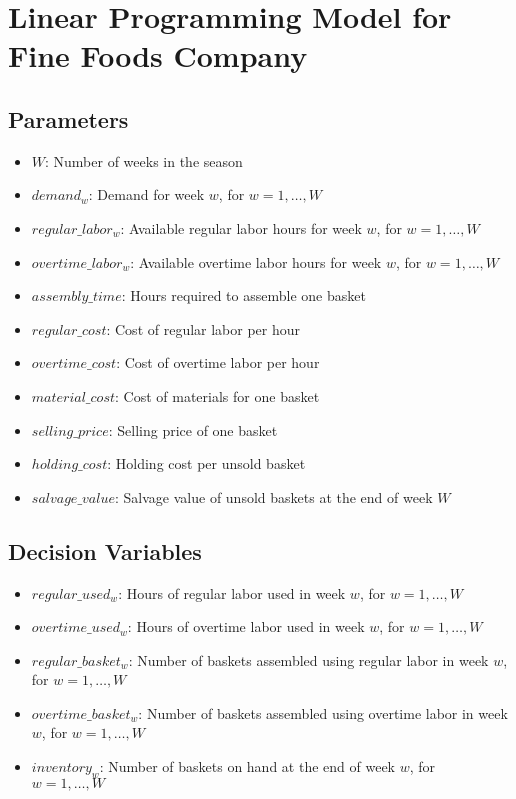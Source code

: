 \documentclass{article}
\begin{document}
\section*{Linear Programming Model for Fine Foods Company}

\subsection*{Parameters}
\begin{itemize}
    \item $W$: Number of weeks in the season
    \item $demand_w$: Demand for week $w$, for $w = 1, \ldots, W$
    \item $regular\_labor_w$: Available regular labor hours for week $w$, for $w = 1, \ldots, W$
    \item $overtime\_labor_w$: Available overtime labor hours for week $w$, for $w = 1, \ldots, W$
    \item $assembly\_time$: Hours required to assemble one basket
    \item $regular\_cost$: Cost of regular labor per hour
    \item $overtime\_cost$: Cost of overtime labor per hour
    \item $material\_cost$: Cost of materials for one basket
    \item $selling\_price$: Selling price of one basket
    \item $holding\_cost$: Holding cost per unsold basket
    \item $salvage\_value$: Salvage value of unsold baskets at the end of week $W$
\end{itemize}

\subsection*{Decision Variables}
\begin{itemize}
    \item $regular\_used_w$: Hours of regular labor used in week $w$, for $w = 1, \ldots, W$
    \item $overtime\_used_w$: Hours of overtime labor used in week $w$, for $w = 1, \ldots, W$
    \item $regular\_basket_w$: Number of baskets assembled using regular labor in week $w$, for $w = 1, \ldots, W$
    \item $overtime\_basket_w$: Number of baskets assembled using overtime labor in week $w$, for $w = 1, \ldots, W$
    \item $inventory_w$: Number of baskets on hand at the end of week $w$, for $w = 1, \ldots, W$
\end{itemize}
\end{document}
